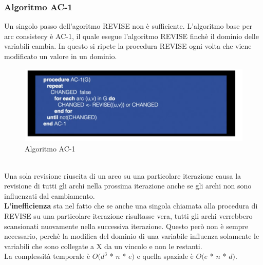 \subsubsection{Algoritmo AC-1}
Un singolo passo dell’agoritmo REVISE non è sufficiente. L’algoritmo base per arc consistecy è AC-1, il quale esegue l’algoritmo REVISE finchè il dominio delle variabili cambia. In questo si ripete la procedura REVISE ogni volta che viene modificato un valore in un dominio.
\begin{figure}[htp]
	\centering
    \includegraphics[width=13cm, keepaspectratio]{img/Cap3/ac-1.png}
    \caption{Algoritmo AC-1}
\end{figure}
\\Una sola revisione riuscita di un arco su una particolare iterazione causa la revisione di tutti gli archi nella prossima iterazione anche se gli archi non sono influenzati dal cambiamento.\\
\textbf{L’inefficienza} sta nel fatto che se anche una singola chiamata alla procedura di REVISE su una particolare iterazione risultasse vera, tutti gli archi verrebbero scansionati nuovamente nella successiva iterazione. Questo però non è sempre necessario, perchè la modifica del dominio di una variabile influenza solamente le variabili che sono collegate a X da un vincolo e non le restanti.\\
La complessità temporale è $O(d^3$ * $n$ * $e)$ e quella spaziale è $O(e$ * $n$ * $d)$.

